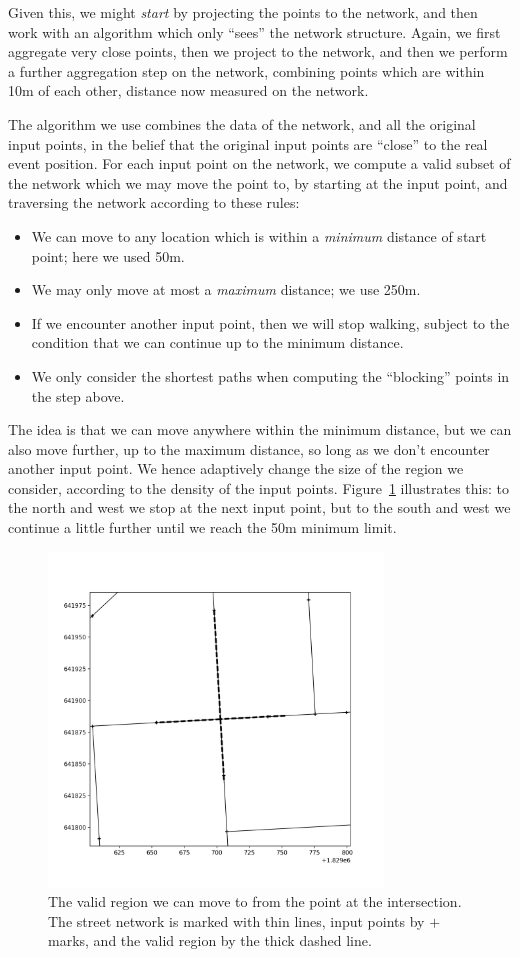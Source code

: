 \documentclass[twoside,a4paper,twocolumn,10pt]{article}
\theoremstyle{plain}
\theoremstyle{definition}
\begin{document}
Given this, we might \emph{start} by projecting the points to the network, and then work with
an algorithm which only ``sees'' the network structure.  Again, we first aggregate very close
points, then we project to the network, and then we perform a further aggregation step on the
network, combining points which are within 10m of each other, distance now measured on the network.

The algorithm we use combines the data
of the network, and all the original input points, in the belief that the original input points
are ``close'' to the real event position.  For each input point on the network, we compute
a valid subset of the network which we may move the point to, by starting at the input point, and
traversing the network according to these rules:
\begin{itemize}
\item We can move to any location which is within a \emph{minimum} distance of start point;
here we used 50m.
\item We may only move at most a \emph{maximum} distance; we use 250m.
\item If we encounter another input point, then we will stop walking, subject to the condition
that we can continue up to the minimum distance.
\item We only consider the shortest paths when computing the ``blocking'' points in the
step above.
\end{itemize}
The idea is that we can move anywhere within the minimum distance, but we can also move
further, up to the maximum distance, so long as we don't encounter another input point.
We hence adaptively
change the size of the region we consider, according to the density of the input points.
Figure~\ref{fig:sf_flow_network} illustrates this: to the north and west we stop at the next
input point, but to the south and west we continue a little further until we reach the 50m
minimum limit.

\begin{figure}
  \includegraphics[width=3.5in]{sf_flow_network.png}
  \caption{The valid region we can move to from the point at the intersection.
The street network is marked with thin lines, input points by $+$ marks, and the valid
region by the thick dashed line.}
  \label{fig:sf_flow_network}
\end{figure}
\end{document}
